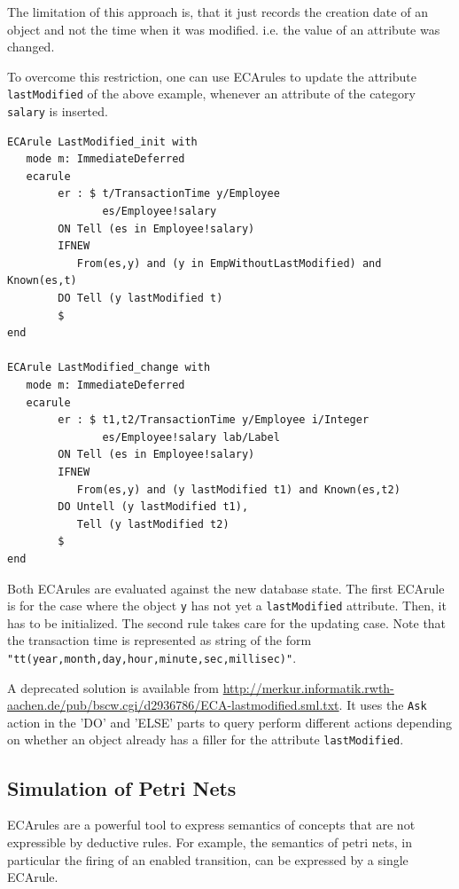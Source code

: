 The limitation of this approach is, that it just records
the creation date of an object and not the time when it
was modified. i.e. the value of an attribute was changed.

To overcome this restriction, one can use ECArules
to update the attribute {\tt lastModified} of the above
example, whenever an attribute of the category {\tt salary} is inserted.

{\small
\begin{verbatim}
ECArule LastModified_init with
   mode m: ImmediateDeferred
   ecarule
        er : $ t/TransactionTime y/Employee
               es/Employee!salary
        ON Tell (es in Employee!salary)
        IFNEW
           From(es,y) and (y in EmpWithoutLastModified) and Known(es,t)
        DO Tell (y lastModified t)
        $
end

ECArule LastModified_change with
   mode m: ImmediateDeferred
   ecarule
        er : $ t1,t2/TransactionTime y/Employee i/Integer
               es/Employee!salary lab/Label
        ON Tell (es in Employee!salary)
        IFNEW 
           From(es,y) and (y lastModified t1) and Known(es,t2)
        DO Untell (y lastModified t1),
           Tell (y lastModified t2)
        $
end
\end{verbatim}
}

Both ECArules are evaluated against the new database state.
The first ECArule is for the case where the object {\tt y}  has not
yet a {\tt lastModified} attribute. Then, it has to be initialized.
The second rule takes care for the updating case.
Note that
the transaction time is represented as string of the
form \verb+"tt(year,month,day,hour,minute,sec,millisec)"+.

A deprecated solution is available from
\url{http://merkur.informatik.rwth-aachen.de/pub/bscw.cgi/d2936786/ECA-lastmodified.sml.txt}.
It uses the {\tt Ask} action in the 'DO' and 'ELSE' parts to query
perform different actions depending on whether an object already has
a filler for the attribute {\tt lastModified}.

\subsection{Simulation of Petri Nets}

ECArules are a powerful tool to express semantics of
concepts that are not expressible by deductive rules. For example,
the semantics of petri nets, in particular the firing of an
enabled transition, can be expressed by a single ECArule.

